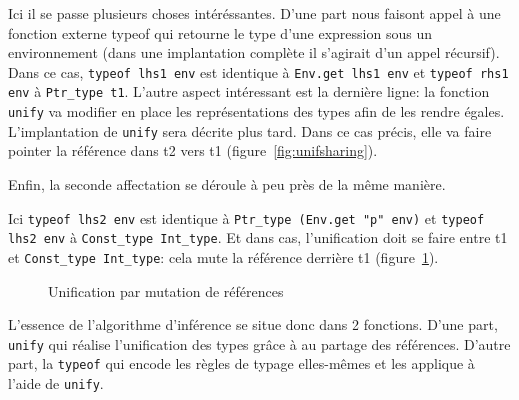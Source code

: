 Ici il se passe plusieurs choses intéréssantes. D'une part nous faisont appel à
une fonction externe typeof qui retourne le type d'une expression sous un
environnement (dans une implantation complète il s'agirait d'un appel récursif).
Dans ce cas, \texttt{typeof lhs1 env} est identique à \texttt{Env.get lhs1 env}
et \texttt{typeof rhs1 env} à \texttt{Ptr\_type t1}. L'autre aspect intéressant
est la dernière ligne: la fonction \texttt{unify} va modifier en place les
représentations des types afin de les rendre égales. L'implantation de
\texttt{unify} sera décrite plus tard. Dans ce cas précis, elle va faire pointer
la référence dans t2 vers t1 (figure~\ref{fig:unifsharing}).

Enfin, la seconde affectation se déroule à peu près de la même manière.


Ici \texttt{typeof lhs2 env} est identique à
\verb!Ptr_type (Env.get "p" env)! et \texttt{typeof lhs2 env} à \texttt{Const\_type Int\_type}. Et dans cas,
l'unification doit se faire entre t1 et \texttt{Const\_type Int\_type}: cela
mute la référence derrière t1 (figure~\ref{fig:typeunifref}).

\begin{figure}
  \caption{Unification par mutation de références}
\label{fig:typeunifref}
\end{figure}

L'essence de l'algorithme d'inférence se situe donc dans 2 fonctions. D'une
part, \texttt{unify} qui réalise l'unification des types grâce à au partage des
références. D'autre part, la \texttt{typeof} qui encode les règles de typage
elles-mêmes et les applique à l'aide de \texttt{unify}.

